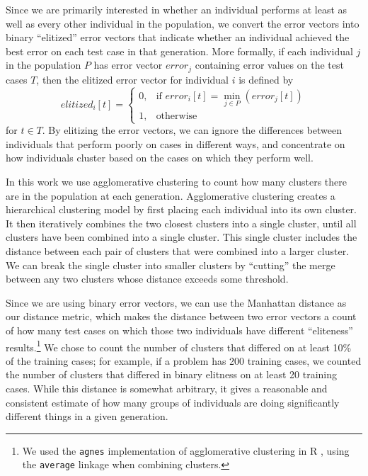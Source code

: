 Since we are primarily interested in whether an individual performs at least as well as every other 
individual in the population, we convert the error vectors into binary ``elitized'' error vectors 
that indicate whether an individual achieved the best error on each test case in that generation. 
More formally, if each individual $j$ in the population $P$ has error vector $error_j$ containing error values on the test cases $T$, then the elitized error vector for individual $i$ is defined by
\[
elitized_i[t] =
\begin{cases}
    0,         & \text{if } error_i[t] = \min\limits_{j \in P} (error_j[t])  \\
    1,         & \text{otherwise}
\end{cases}
\]
for $t \in T$.
By elitizing the error vectors, we can ignore the differences between individuals that perform poorly on cases in different 
ways, and concentrate on how individuals cluster based on the cases on which they perform well.

In this work we use agglomerative clustering to count how many clusters there are in the population 
at each generation. Agglomerative clustering creates 
a hierarchical clustering model by first placing each individual into its own cluster. It then 
iteratively combines the two closest clusters into a single cluster, until all clusters have been 
combined into a single cluster. This single cluster includes the distance between each pair of clusters 
that were combined into a larger cluster. We can break the single cluster into smaller clusters by
``cutting'' the merge between any two clusters whose distance exceeds some threshold.

Since we are using binary error vectors, we can use the 
Manhattan distance as our distance metric, which makes the distance between two error vectors
a count of how many test cases on which those two individuals have different ``eliteness'' 
results.\footnote{We used the \texttt{agnes} \citep{cluster} implementation of 
	agglomerative clustering in R \citep{R}, using the \texttt{average} linkage when 
	combining clusters.} 
We chose to count the number of clusters that differed on at least 10\% of the training cases; 
for example, if a problem has 200 training cases, we counted the number of clusters that differed 
in binary elitness on at least 20 training cases. While this distance is somewhat arbitrary, 
it gives a reasonable and consistent estimate of how many groups of individuals are doing 
significantly different things in a given generation.

